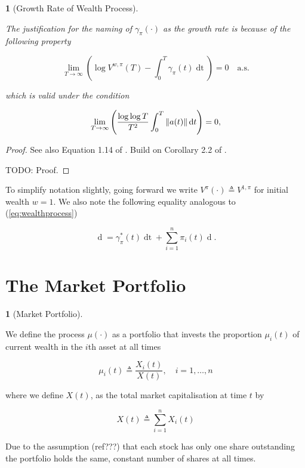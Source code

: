 \documentclass[british]{amsart}
\numberwithin{equation}{section}
\numberwithin{figure}{section}
\theoremstyle{plain}
\theoremstyle{definition}
\newtheorem{defn}[thm]{\protect\definitionname}
\theoremstyle{plain}
\theoremstyle{plain}
\theoremstyle{plain}
\newtheorem{prop}[thm]{\protect\propositionname}
\theoremstyle{remark}
\theoremstyle{plain}
\providecommand{\definitionname}{Definition}
\providecommand{\propositionname}{Proposition}
\renewcommand{\d}[1]{\mathop{\mathrm{d}{#1}}}
\newcommand{\defeq}{\mathop{\triangleq}}
\newcommand{\almostsurely}{\text{a.s.}}
\newcommand{\rangei}{i=1,\dots,n}
\begin{document}
\begin{prop} [Growth Rate of Wealth Process] \label{thm:wealthgrowthrate}

  The justification for the naming of $\gamma_{\pi}(\cdot)$ as the
\textit{growth rate} is because of the following property

  \begin{equation*} \lim_{T \to \infty} \left( \log{V^{w,\pi}(T)} - \int_{0}^{T}
\gamma_{\pi}(t)\d{t} \right) = 0 \quad \almostsurely \end{equation*}

  which is valid under the condition

  \begin{equation*} \lim_{T \to \infty} \left( \frac{\log \log T}{T^2}
\int_{0}^{T} \norm{ a(t) } \d{t} \right) = 0,
  \end{equation*}

\end{prop}

\begin{proof} See also Equation 1.14 of \cite{fernholz2009}. Build on Corollary
2.2 of \cite{fernholz1999pgf}.

  TODO: Proof. \end{proof}

To simplify notation slightly, going forward we write $V^{\pi}(\cdot) \defeq
V^{1,\pi}$ for initial wealth $w=1$. We also note the following equality
analogous to (\ref{eq:wealthprocess})

\begin{equation} \label{eq:logvalueprocess} \d{\log V^{\pi}(t)} =
\gamma_{\pi}^{*}(t)\d{t} + \sum_{i=1}^{n} \pi_{i}(t) \d{\log{X_{i}(t)}}.
\end{equation}

\newpage

\section{The Market Portfolio}

\begin{defn} [Market Portfolio] \label{def:marketportfolio}

  We define the process $\mu(\cdot)$ as a portfolio that invests the proportion
$\mu_{i}(t)$ of current wealth in the $i$th asset at all times

  \begin{equation} \label{eq:marketportfolio} \mu_{i}(t) \defeq
\frac{X_{i}(t)}{X(t)}, \quad \rangei \end{equation}

  where we define $X(t)$, as the total market capitalisation at time $t$ by

  \begin{equation} \label{eq:totalmarketcapitalisation} X(t) \defeq
\sum_{i=1}^{n} X_{i}(t) \end{equation}

  Due to the  assumption (ref???) that each stock has only one share outstanding
the portfolio holds the same, constant number of shares at all times.

\end{defn}
\end{document}
